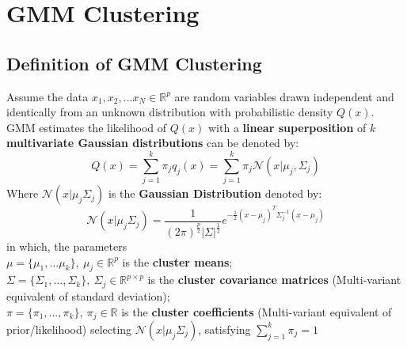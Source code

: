 \documentclass{article}
\begin{document}


\section{GMM Clustering}

\subsection{Definition of GMM Clustering}
Assume the data $x_1,x_2,...x_N \in \mathbb{R}^{p}$ are random variables drawn independent and identically from an unknown distribution with probabilistic density $Q(x)$. GMM estimates the likelihood of $Q(x)$ with a \textbf{linear superposition} of $k$ \textbf{multivariate Gaussian distributions} can be denoted by:\[
Q(x) = \sum_{j=1}^{k}\pi_{j}q_{j}(x)=\sum_{j=1}^{k}\pi_{j}\mathcal{N}   (x|\mu_{j},\Sigma_{j})
\]
Where $\mathcal{N}(x|\mu_{j}\Sigma_{j})$ is the \textbf{Gaussian Distribution} denoted by:\[
\mathcal{N}(x|\mu_{j}\Sigma_{j})=\frac{1}{(2\pi)^{\frac{p}{2}}|\Sigma|^{\frac{1}{2}}}e^{-\frac{1}{2}(x-\mu_{j})^{T}\Sigma_{j}^{-1}(x-\mu_{j})}
\]
in which, the parameters\\
$\mu = \{\mu_1,...\mu_k\}, \: \mu_{j} \in \mathbb{R}^{p}$ is the \textbf{cluster means};\\
$\Sigma = \{\Sigma_1,...,\Sigma_k\}, \: \Sigma_{j} \in \mathbb{R}^{p\times p}$ is the \textbf{cluster covariance matrices} (Multi-variant equivalent of standard deviation);\\
$\pi = \{\pi_1,...,\pi_k\}, \: \pi_{j}\in \mathbb{R}$ is the \textbf{cluster coefficients} (Multi-variant equivalent of prior/likelihood) selecting $\mathcal{N}(x|\mu_{j}\Sigma_{j})$, satisfying $\sum_{j=1}^k \pi_j = 1$\\
\end{document}
